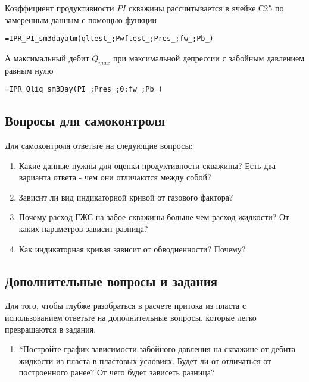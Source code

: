 Коэффициент продуктивности $PI$ скважины рассчитывается в ячейке С25 по замеренным данным  с помощью функции

{ \small  \texttt{=IPR\_PI\_sm3dayatm(qltest\_;Pwftest\_;Pres\_;fw\_;Pb\_)}}

А максимальный дебит $Q_{max}$ при максимальной депрессии с забойным давлением равным нулю

{ \small  \texttt{=IPR\_Qliq\_sm3Day(PI\_;Pres\_;0;fw\_;Pb\_)}}


\subsection{Вопросы для самоконтроля}
Для самоконтроля ответьте на следующие вопросы:

\begin{enumerate}
	
	\item Какие данные нужны для оценки продуктивности скважины? Есть два варианта ответа - чем они отличаются между собой?
	
	\item Зависит ли вид индикаторной кривой от газового фактора?
	
	\item Почему расход ГЖС на забое скважины больше чем расход жидкости? От каких параметров зависит разница?
	
  	\item Как индикаторная кривая зависит от обводненности? Почему?
	
	
\end{enumerate}

\subsection{Дополнительные вопросы и задания}

Для того, чтобы глубже разобраться в расчете притока из пласта с использованием \unf{} ответьте на дополнительные вопросы, которые легко превращаются в задания.

\begin{enumerate}
	
	\item  *Постройте график зависимости забойного давления на скважине от дебита жидкости из пласта в пластовых условиях. Будет ли от отличаться от построенного ранее? От чего будет зависеть разница?
	
	
\end{enumerate}